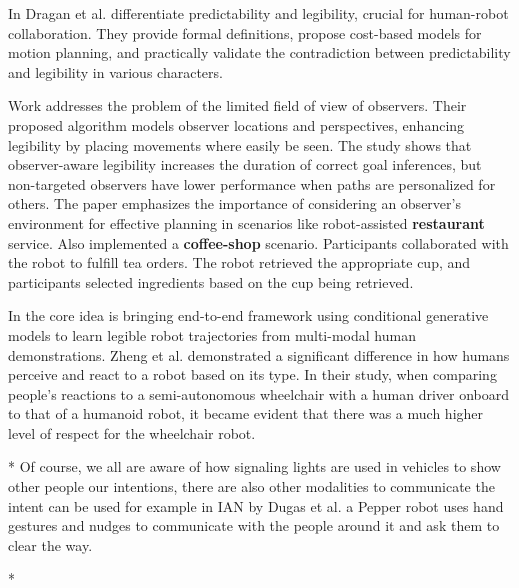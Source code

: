 In \cite{dragan2013legibility} Dragan et al. differentiate predictability and legibility, crucial for human-robot collaboration. They provide formal definitions, propose cost-based models for motion planning, and practically validate the contradiction between predictability and legibility in various characters.

Work \cite{taylor2022observeraware} addresses the problem of the limited field of view of observers. Their proposed algorithm models observer locations and perspectives, enhancing legibility by placing movements where easily be seen. The study shows that observer-aware legibility increases the duration of correct goal inferences, but non-targeted observers have lower performance when paths are personalized for others. The paper emphasizes the importance of considering an observer's environment for effective planning in scenarios like robot-assisted \textbf{restaurant} service. Also \cite{dragan2015effects} implemented a \textbf{coffee-shop} scenario. Participants collaborated with the robot to fulfill tea orders. The robot retrieved the appropriate cup, and participants selected ingredients based on the cup being retrieved.

In \cite{bronars2023_GLMM} the core idea is bringing end-to-end framework using conditional generative models to learn legible robot trajectories from multi-modal human demonstrations. 
%
Zheng et al. \cite{PAT2021IJSR} demonstrated a significant difference in how humans perceive and react to a robot based on its type. In their study, when comparing people's reactions to a semi-autonomous wheelchair with a human driver onboard to that of a humanoid robot, it became evident that there was a much higher level of respect for the wheelchair robot.

* Of course, we all are aware of how signaling lights are used in vehicles to show other people our intentions, there are also other modalities to communicate the intent can be used for example in IAN by Dugas et al. \cite{dugas2020_IAN} a Pepper robot uses hand gestures and nudges to communicate with the people around it and ask them to clear the way. 

* \cite{fukuchi2009focus}